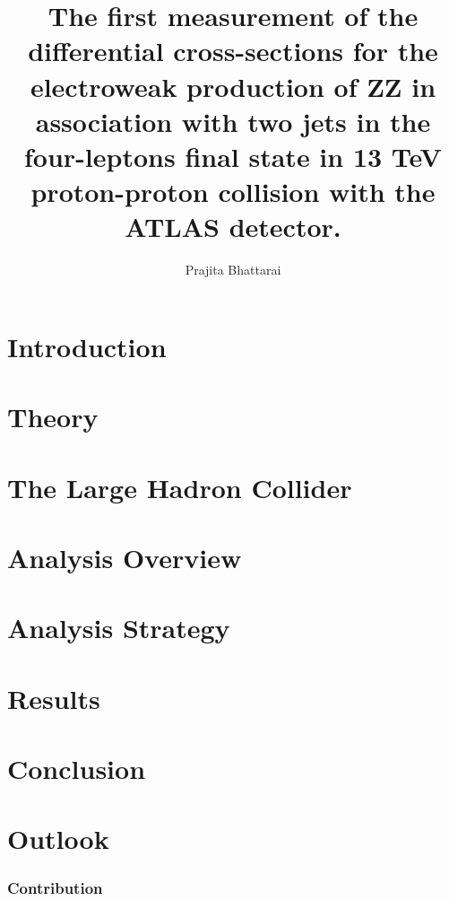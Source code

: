 \documentclass[red]{brandeis-dissertation}
\title{The first measurement of the differential cross-sections for the electroweak production of ZZ in association with two jets in the four-leptons final state in 13 TeV proton-proton collision with the ATLAS detector.}
\author{Prajita Bhattarai}
\begin{document}
\maketitlepage
\clearpage
\makeapproval
\clearpage
\makecopyright
\clearpage
{}

\clearpage


\begin{dissertation-abstract}

\end{dissertation-abstract}
\clearpage

\doublespacing

\tableofcontents
\clearpage
{}
{}
\listoftables
\clearpage
{}
{}
\listoffigures
\clearpage


\startbody

\renewcommand{\partname}{Chapter}

\part{\LARGE{Introduction}}

\clearpage

\part {\LARGE{Theory}}

\clearpage

\part {\LARGE{The Large Hadron Collider}}

\clearpage

\part {\LARGE{Analysis Overview}}

\clearpage

\part {\LARGE{Analysis Strategy}}

\clearpage

\part {\LARGE{Results}}

\clearpage

\part {\LARGE{Conclusion}}

\clearpage

\part {\LARGE{Outlook}}

	
	
\clearpage

\appendix
\section{Contribution}
\clearpage
\end{document}
